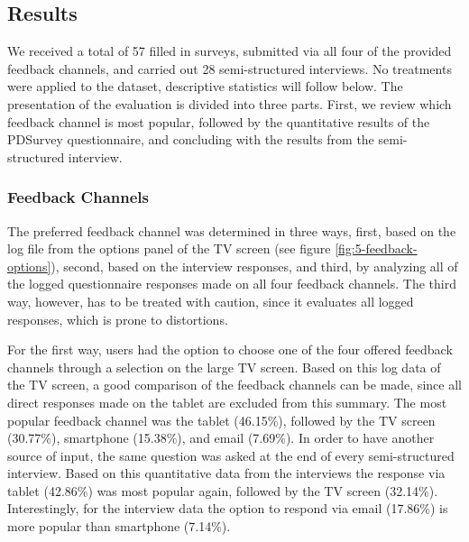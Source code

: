 \subsection{Results}


	We received a total of 57 filled in surveys, submitted via all four of the provided feedback channels, and carried out 28 semi-structured interviews. No treatments were applied to the dataset, descriptive statistics will follow below. The presentation of the evaluation is divided into three parts. First, we review which feedback channel is most popular, followed by the quantitative results of the PDSurvey questionnaire, and concluding with the results from the semi-structured interview. 







	\subsubsection{Feedback Channels}
	\label{5:results:feedback-channels}

	The preferred feedback channel was determined in three ways, first, based on the log file from the options panel of the TV screen (see figure \ref{fig:5-feedback-options}), second, based on the interview responses, and third, by analyzing all of the logged questionnaire responses made on all four feedback channels. The third way, however, has to be treated with caution, since it evaluates all logged responses, which is prone to distortions.

	For the first way, users had the option to choose one of the four offered feedback channels through a selection on the large TV screen. Based on this log data of the TV screen, a good comparison of the feedback channels can be made, since all direct responses made on the tablet are excluded from this summary. The most popular feedback channel was the tablet (46.15\%), followed by the TV screen (30.77\%), smartphone (15.38\%), and email (7.69\%).
	In order to have another source of input, the same question was asked at the end of every semi-structured interview. Based on this quantitative data from the interviews the response via tablet (42.86\%) was most popular again, followed by the TV screen (32.14\%). Interestingly, for the interview data the option to respond via email (17.86\%) is more popular than smartphone (7.14\%). 
	


